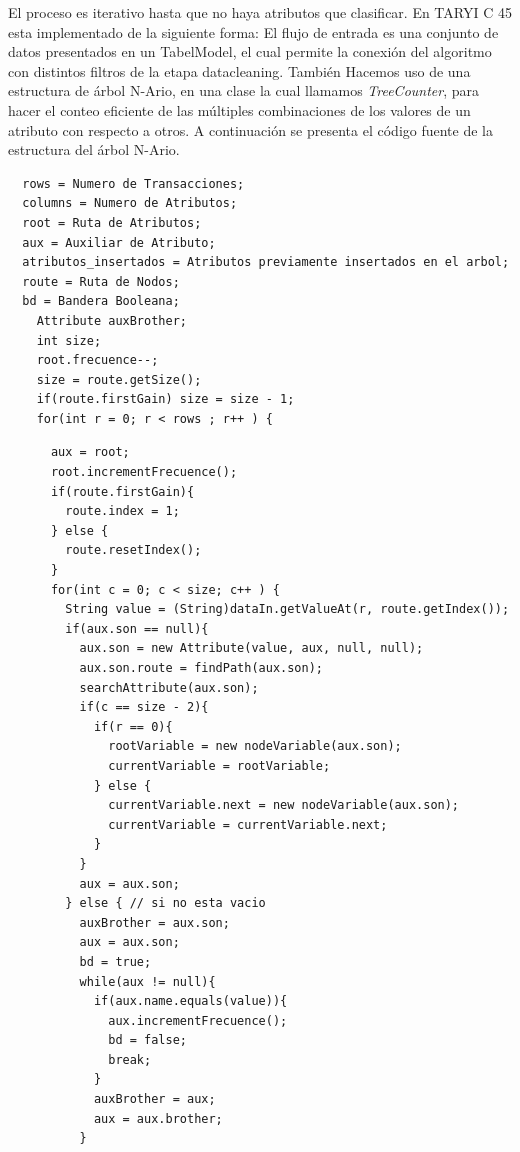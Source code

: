 El proceso es iterativo hasta que no haya atributos que clasificar. En TARYI C 45 esta implementado de la
siguiente forma: El flujo de entrada es una conjunto de datos presentados en un TabelModel, el cual permite la
conexi\'on del algoritmo con distintos filtros de la etapa datacleaning. Tambi\'en Hacemos uso  de una estructura
de \'arbol N-Ario, en una clase la cual llamamos \textit{TreeCounter}, para hacer el conteo eficiente de las
m\'ultiples combinaciones de los valores  de un atributo con respecto a otros. A continuaci\'on se presenta el
c\'odigo fuente de la estructura del \'arbol N-Ario.\\

\begin{codigof}[!h]
\begin{verbatim}
  rows = Numero de Transacciones;
  columns = Numero de Atributos;
  root = Ruta de Atributos;
  aux = Auxiliar de Atributo;
  atributos_insertados = Atributos previamente insertados en el arbol;  
  route = Ruta de Nodos;
  bd = Bandera Booleana;
    Attribute auxBrother;
    int size;
    root.frecuence--;
    size = route.getSize(); 
    if(route.firstGain) size = size - 1;
    for(int r = 0; r < rows ; r++ ) {
\end{verbatim}
\end{codigof}

\newpage
\begin{codigof}[!h]
\begin{verbatim}
      aux = root;
      root.incrementFrecuence();
      if(route.firstGain){
        route.index = 1;
      } else {
        route.resetIndex();
      }
      for(int c = 0; c < size; c++ ) {  
        String value = (String)dataIn.getValueAt(r, route.getIndex());
        if(aux.son == null){ 
          aux.son = new Attribute(value, aux, null, null);
          aux.son.route = findPath(aux.son);
          searchAttribute(aux.son);
          if(c == size - 2){
            if(r == 0){
              rootVariable = new nodeVariable(aux.son);
              currentVariable = rootVariable;
            } else {
              currentVariable.next = new nodeVariable(aux.son);
              currentVariable = currentVariable.next;
            }
          }
          aux = aux.son;
        } else { // si no esta vacio
          auxBrother = aux.son;
          aux = aux.son;
          bd = true;
          while(aux != null){
            if(aux.name.equals(value)){  
              aux.incrementFrecuence();
              bd = false;
              break;
            }
            auxBrother = aux; 
            aux = aux.brother;
          }
\end{verbatim}
\end{codigof}

